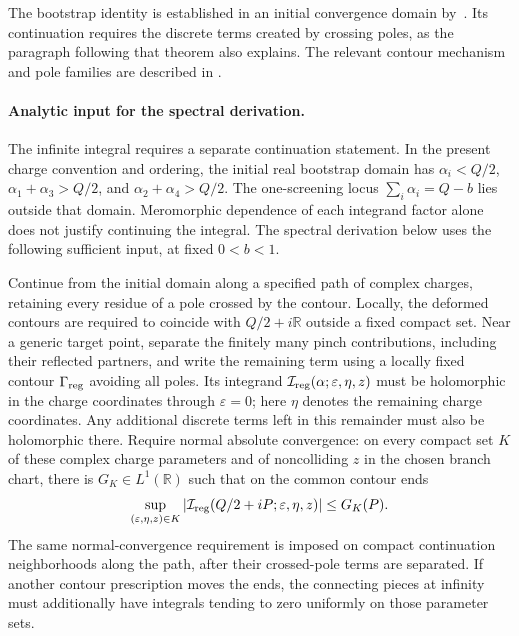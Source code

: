 \documentclass[11pt,a4paper]{article}
\numberwithin{equation}{section}
\theoremstyle{definition}
\theoremstyle{remark}
\newcommand{\RR}{\mathbb R}
\begin{document}
The bootstrap identity is established in an initial convergence
domain by~\cite[Theorem~1.1]{GKRVBootstrap}. Its continuation
requires the discrete terms created by crossing poles, as the
paragraph following that theorem also explains. The relevant
contour mechanism and pole families are described in
\cite[Section~7.2, eqs.~(87)--(90)]{TeschnerRevisited}.

\paragraph{Analytic input for the spectral derivation.}
The infinite integral requires a separate continuation statement.
In the present charge convention and ordering, the initial real
bootstrap domain has $\alpha_i<Q/2$,
$\alpha_1+\alpha_3>Q/2$, and $\alpha_2+\alpha_4>Q/2$.
The one-screening locus $\sum_i\alpha_i=Q-b$ lies outside that
domain. Meromorphic dependence of each integrand factor alone
does not justify continuing the integral. The spectral derivation
below uses the following sufficient input, at fixed $0<b<1$.

Continue from the initial domain along a specified path of complex
charges, retaining every residue of a pole crossed by the contour.
Locally, the deformed contours are required to coincide with
$Q/2+i\RR$ outside a fixed compact set. Near a generic target point,
separate the finitely many pinch contributions, including their
reflected partners, and write the remaining term using a locally
fixed contour $\Gamma_{\rm reg}$ avoiding all poles. Its integrand
$\mathcal I_{\rm reg}(\alpha;\varepsilon,\eta,z)$ must be holomorphic
in the charge coordinates through $\varepsilon=0$; here $\eta$
denotes the remaining charge coordinates. Any additional discrete
terms left in this remainder must also be holomorphic there.
Require normal absolute convergence: on every compact set $K$ of
these complex charge parameters and of noncolliding $z$ in the
chosen branch chart, there is $G_K\in L^1(\RR)$ such that on the
common contour ends
\begin{equation}
 \sup_{(\varepsilon,\eta,z)\in K}
 \left|\mathcal I_{\rm reg}(Q/2+iP;\varepsilon,\eta,z)\right|
 \le G_K(P).
 \label{eq:screeningtailinput}
\end{equation}
The same normal-convergence requirement is imposed on compact
continuation neighborhoods along the path, after their crossed-pole
terms are separated. If another contour prescription moves the ends,
the connecting pieces at infinity must additionally have integrals
tending to zero uniformly on those parameter sets.
\end{document}

